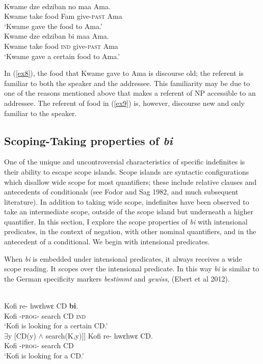 \documentclass[output=paper,modfonts]{langsci/langscibook}
\begin{document}
\ea {}\\
\ea\label{ex8}
\gll  Kwame dze edziban no maa Ama.\\
   Kwame take food Fam give-\textsc{past} Ama \\ 
\glt `Kwame gave the food to Ama.'\\

\ex\label{ex9} 
\gll Kwame dze edziban bi maa Ama.\\
   Kwame take food \textsc{ind} give-\textsc{past} Ama \\ 
\glt `Kwame gave a certain food to Ama.'\\
\z \z 

In (\ref{ex8}), the food that Kwame gave to Ama is discourse old; the referent is familiar to both the speaker and the addressee. This familiarity may be due to one of the reasons mentioned above that makes a referent of NP accessible to an addressee. The referent of food in (\ref{ex9}) is, however, discourse new and only familiar to the speaker.
	 
\subsection{Scoping-Taking properties of \emph{bi}}
One of the unique and uncontroversial characteristics of specific indefinites is their ability to escape scope islands. Scope islands are syntactic configurations which disallow wide scope for most quantifiers; these include relative clauses and antecedents of conditionals (see Fodor and Sag 1982, and much subsequent literature). In addition to taking wide scope, indefinites have been observed to take an intermediate scope, outside of the scope island but underneath a higher quantifier. In this section, I explore the scope properties of \emph{bi} with intensional predicates, in the context of negation, with other nominal quantifiers, and in the antecedent of a conditional. We begin with intensional predicates.

   When \emph{bi} is embedded under intensional predicates, it always receives a wide scope reading. It scopes over the intensional predicate. In this way \emph{bi} is similar to the German specificity markers \emph{bestimmt} and \emph{gewiss}, (Ebert et al 2012).
   
 \ea 
 \\
 \ea \label{006}
\gll Kofi re- hwεhwε CD \textbf{bi}.\\
    Kofi -\textsc{prog}-  search CD \textsc{ind}\\
\glt `Kofi is looking for a certain CD.'\\
$\exists$y [CD(y) $\wedge$ search(K,y)]]
\ex\label{006b}
\gll Kofi re- hwεhwε CD.\\
 Kofi -\textsc{prog}-  search CD  \\
\glt `Kofi is looking for a CD.'
\z \z 
\end{document}
